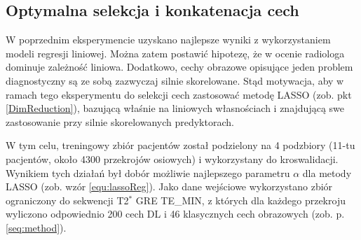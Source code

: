 \subsection{Optymalna selekcja i konkatenacja cech}
\label{seq:fusion}
W poprzednim eksperymencie uzyskano najlepsze wyniki z wykorzystaniem modeli regresji liniowej. Można zatem postawić hipotezę, że w ocenie radiologa dominuje zależność liniowa. Dodatkowo, cechy obrazowe opisujące jeden problem diagnostyczny są ze sobą zazwyczaj silnie skorelowane. Stąd motywacja, aby w ramach tego eksperymentu do selekcji cech zastosować metodę LASSO (zob. pkt \ref{DimReduction}), bazującą właśnie na liniowych własnościach i znajdującą swe zastosowanie przy silnie skorelowanych predyktorach.  

W tym celu, treningowy zbiór pacjentów został podzielony na 4 podzbiory (11-tu pacjentów, około 4300 przekrojów osiowych) i wykorzystany do kroswalidacji. Wynikiem tych działań był dobór możliwie najlepszego parametru $\alpha$ dla metody LASSO (zob. wzór \ref{equ:lassoReg}). Jako dane wejściowe wykorzystano zbiór ograniczony do sekwencji T2$^\ast$ GRE TE\_MIN, z których dla każdego przekroju wyliczono odpowiednio 200 cech DL i 46 klasycznych cech obrazowych (zob. p. \ref{seq:method}).

